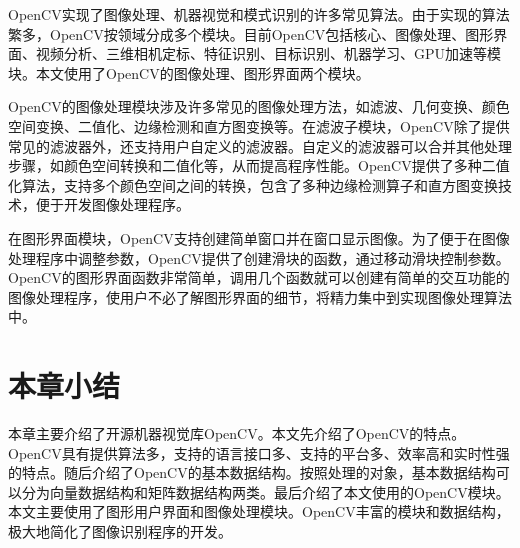 OpenCV实现了图像处理、机器视觉和模式识别的许多常见算法。由于实现的算法繁多，OpenCV按领域分成多个模块。目前OpenCV包括核心、图像处理、图形界面、视频分析、三维相机定标、特征识别、目标识别、机器学习、GPU加速等模块。本文使用了OpenCV的图像处理、图形界面两个模块。

OpenCV的图像处理模块涉及许多常见的图像处理方法，如滤波、几何变换、颜色空间变换、二值化、边缘检测和直方图变换等。在滤波子模块，OpenCV除了提供常见的滤波器外，还支持用户自定义的滤波器。自定义的滤波器可以合并其他处理步骤，如颜色空间转换和二值化等，从而提高程序性能。OpenCV提供了多种二值化算法，支持多个颜色空间之间的转换，包含了多种边缘检测算子和直方图变换技术，便于开发图像处理程序。

在图形界面模块，OpenCV支持创建简单窗口并在窗口显示图像。为了便于在图像处理程序中调整参数，OpenCV提供了创建滑块的函数，通过移动滑块控制参数。OpenCV的图形界面函数非常简单，调用几个函数就可以创建有简单的交互功能的图像处理程序，使用户不必了解图形界面的细节，将精力集中到实现图像处理算法中。


\section{本章小结}

本章主要介绍了开源机器视觉库OpenCV。本文先介绍了OpenCV的特点。OpenCV具有提供算法多，支持的语言接口多、支持的平台多、效率高和实时性强的特点。随后介绍了OpenCV的基本数据结构。按照处理的对象，基本数据结构可以分为向量数据结构和矩阵数据结构两类。最后介绍了本文使用的OpenCV模块。本文主要使用了图形用户界面和图像处理模块。OpenCV丰富的模块和数据结构，极大地简化了图像识别程序的开发。

